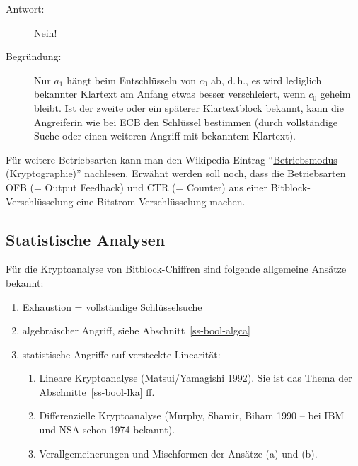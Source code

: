 \begin{refsegment}
\begin{description}
  \item[Antwort:] Nein!

  \item[Begründung:] Nur $a_1$ hängt beim Entschlüsseln von $c_0$ ab,
     d.\,h., es wird lediglich bekannter
     Klartext am Anfang etwas besser
     verschleiert, wenn $c_0$ geheim bleibt. Ist der zweite oder ein
     späterer Klartextblock bekannt, kann die Angreiferin wie bei ECB den
     Schlüssel bestimmen (durch vollständige Suche oder einen weiteren
     Angriff mit bekanntem Klartext).
\end{description}

Für weitere Betriebsarten kann man den Wikipedia-Eintrag
"`\href{http://de.wikipedia.org/wiki/Betriebsmodus_(Kryptographie)}{Betriebsmodus
(Kryptographie)}"' nachlesen. Erwähnt werden soll noch, dass die
Betriebsarten OFB (= Output Feedback) und CTR
(= Counter) aus einer
Bitblock-Verschlüsselung eine Bitstrom-Verschlüsselung machen.

\subsection{Statistische Analysen}\label{ss-bool-bbstat}

Für die Kryptoanalyse von Bitblock-Chiffren sind folgende allgemeine Ansätze
bekannt:
\begin{enumerate}
\item Exhaustion = vollständige Schlüsselsuche
\item algebraischer Angriff,
    siehe Abschnitt~\ref{ss-bool-algca}
\item statistische Angriffe
    auf versteckte Linearität:
    \begin{enumerate}
    \item Lineare Kryptoanalyse
        (Matsui/Yamagishi 1992).
        Sie ist das Thema der Abschnitte~\ref{ss-bool-lka} ff.
    \item Differenzielle
         Kryptoanalyse
        (Murphy,
        Shamir, Biham 1990
        -- bei IBM und NSA schon 1974 bekannt).
    \item Verallgemeinerungen und Mischformen der Ansätze (a) und (b).
    \end{enumerate}
\end{enumerate}


\end{refsegment}
